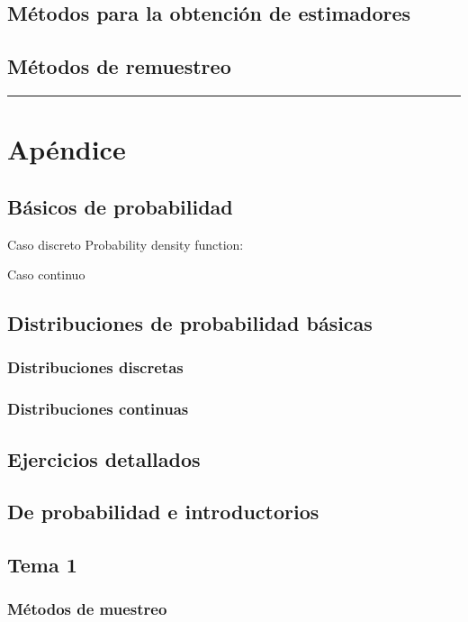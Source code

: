 \documentclass{article}
\begin{document}
		\subsection{Métodos para la obtención de estimadores}
		\subsection{Métodos de remuestreo}
		


{\color{gray} \rule{\linewidth}{0.5mm} }

\section*{Apéndice}
  	\subsection{Básicos de probabilidad}
  	
  	 Caso discreto
  	Probability density function: 

    
 	Caso continuo

 
  	
  	
	\subsection{Distribuciones de probabilidad básicas}
		\subsubsection{Distribuciones discretas}
		\subsubsection{Distribuciones continuas}	
	

	\subsection{Ejercicios detallados}
		\subsection{De probabilidad e introductorios}
		\subsection{Tema 1}
			\subsubsection{Métodos de muestreo}
\end{document}

